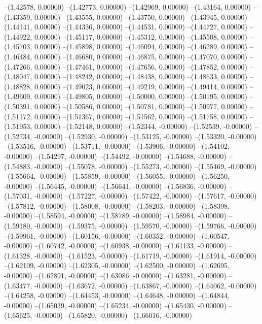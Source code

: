 --(1.42578, 0.00000)
--(1.42773, 0.00000)
--(1.42969, 0.00000)
--(1.43164, 0.00000)
--(1.43359, 0.00000)
--(1.43555, 0.00000)
--(1.43750, 0.00000)
--(1.43945, 0.00000)
--(1.44141, 0.00000)
--(1.44336, 0.00000)
--(1.44531, 0.00000)
--(1.44727, 0.00000)
--(1.44922, 0.00000)
--(1.45117, 0.00000)
--(1.45312, 0.00000)
--(1.45508, 0.00000)
--(1.45703, 0.00000)
--(1.45898, 0.00000)
--(1.46094, 0.00000)
--(1.46289, 0.00000)
--(1.46484, 0.00000)
--(1.46680, 0.00000)
--(1.46875, 0.00000)
--(1.47070, 0.00000)
--(1.47266, 0.00000)
--(1.47461, 0.00000)
--(1.47656, 0.00000)
--(1.47852, 0.00000)
--(1.48047, 0.00000)
--(1.48242, 0.00000)
--(1.48438, 0.00000)
--(1.48633, 0.00000)
--(1.48828, 0.00000)
--(1.49023, 0.00000)
--(1.49219, 0.00000)
--(1.49414, 0.00000)
--(1.49609, 0.00000)
--(1.49805, 0.00000)
--(1.50000, 0.00000)
--(1.50195, 0.00000)
--(1.50391, 0.00000)
--(1.50586, 0.00000)
--(1.50781, 0.00000)
--(1.50977, 0.00000)
--(1.51172, 0.00000)
--(1.51367, 0.00000)
--(1.51562, 0.00000)
--(1.51758, 0.00000)
--(1.51953, 0.00000)
--(1.52148, 0.00000)
--(1.52344, -0.00000)
--(1.52539, -0.00000)
--(1.52734, -0.00000)
--(1.52930, -0.00000)
--(1.53125, -0.00000)
--(1.53320, -0.00000)
--(1.53516, -0.00000)
--(1.53711, -0.00000)
--(1.53906, -0.00000)
--(1.54102, -0.00000)
--(1.54297, -0.00000)
--(1.54492, -0.00000)
--(1.54688, -0.00000)
--(1.54883, -0.00000)
--(1.55078, -0.00000)
--(1.55273, -0.00000)
--(1.55469, -0.00000)
--(1.55664, -0.00000)
--(1.55859, -0.00000)
--(1.56055, -0.00000)
--(1.56250, -0.00000)
--(1.56445, -0.00000)
--(1.56641, -0.00000)
--(1.56836, -0.00000)
--(1.57031, -0.00000)
--(1.57227, -0.00000)
--(1.57422, -0.00000)
--(1.57617, -0.00000)
--(1.57812, -0.00000)
--(1.58008, -0.00000)
--(1.58203, -0.00000)
--(1.58398, -0.00000)
--(1.58594, -0.00000)
--(1.58789, -0.00000)
--(1.58984, -0.00000)
--(1.59180, -0.00000)
--(1.59375, -0.00000)
--(1.59570, -0.00000)
--(1.59766, -0.00000)
--(1.59961, -0.00000)
--(1.60156, -0.00000)
--(1.60352, -0.00000)
--(1.60547, -0.00000)
--(1.60742, -0.00000)
--(1.60938, -0.00000)
--(1.61133, -0.00000)
--(1.61328, -0.00000)
--(1.61523, -0.00000)
--(1.61719, -0.00000)
--(1.61914, -0.00000)
--(1.62109, -0.00000)
--(1.62305, -0.00000)
--(1.62500, -0.00000)
--(1.62695, -0.00000)
--(1.62891, -0.00000)
--(1.63086, -0.00000)
--(1.63281, -0.00000)
--(1.63477, -0.00000)
--(1.63672, -0.00000)
--(1.63867, -0.00000)
--(1.64062, -0.00000)
--(1.64258, -0.00000)
--(1.64453, -0.00000)
--(1.64648, -0.00000)
--(1.64844, -0.00000)
--(1.65039, -0.00000)
--(1.65234, -0.00000)
--(1.65430, -0.00000)
--(1.65625, -0.00000)
--(1.65820, -0.00000)
--(1.66016, -0.00000)
